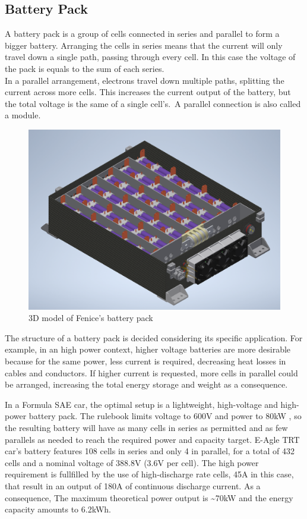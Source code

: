 \subsection{Battery Pack}
A battery pack is a group of cells connected in series and parallel to form a bigger battery. Arranging the cells in series means that the current will only travel down a single path, passing through every cell. In this case the voltage of the pack is equals to the sum of each series.\\
In a parallel arrangement, electrons travel down multiple paths, splitting the current across more cells. This increases the current output of the battery, but the total voltage is the same of a single cell's.\ A parallel connection is also called a module.
\begin{figure}[H]
    \centering
    \includegraphics[scale=0.5]{pictures/pack.png}
    \caption{3D model of Fenice's battery pack}
    \label{fig:pack}
\end{figure}
The structure of a battery pack is decided considering its specific application. For example, in an high power context, higher voltage batteries are more desirable because for the same power, less current is required, decreasing heat losses in cables and conductors. If higher current is requested, more cells in parallel could be arranged, increasing the total energy storage and weight as a consequence.

In a Formula SAE car, the optimal setup is a lightweight, high-voltage and high-power battery pack. The rulebook limits voltage to 600V \cite[EV 4.1.1]{fsg2020} and power to 80kW \cite[EV 2.2.1]{fsg2020}, so the resulting battery will have as many cells in series as permitted and as few parallels as needed to reach the required power and capacity target. E-Agle TRT car's battery features 108 cells in series and only 4 in parallel, for a total of 432 cells and a nominal voltage of 388.8V (3.6V per cell). The high power requirement is fullfilled by the use of high-discharge rate cells, 45A in this case, that result in an output of 180A of continuous discharge current. As a consequence, The maximum theoretical power output is \~{}70kW and the energy capacity amounts to 6.2kWh.

